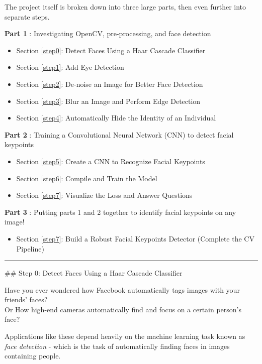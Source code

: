\documentclass[11pt]{article}
\providecommand{\tightlist}{%
      \setlength{\itemsep}{0pt}\setlength{\parskip}{0pt}}
\begin{document}
The project itself is broken down into three large parts, then even
further into separate steps.

\textbf{Part 1} : Investigating OpenCV, pre-processing, and face
detection

\begin{itemize}
\tightlist
\item
  Section \ref{step0}: Detect Faces Using a Haar Cascade Classifier
\item
  Section \ref{step1}: Add Eye Detection
\item
  Section \ref{step2}: De-noise an Image for Better Face Detection
\item
  Section \ref{step3}: Blur an Image and Perform Edge Detection
\item
  Section \ref{step4}: Automatically Hide the Identity of an Individual
\end{itemize}

\textbf{Part 2} : Training a Convolutional Neural Network (CNN) to
detect facial keypoints

\begin{itemize}
\tightlist
\item
  Section \ref{step5}: Create a CNN to Recognize Facial Keypoints
\item
  Section \ref{step6}: Compile and Train the Model
\item
  Section \ref{step7}: Visualize the Loss and Answer Questions
\end{itemize}

\textbf{Part 3} : Putting parts 1 and 2 together to identify facial
keypoints on any image!

\begin{itemize}
\tightlist
\item
  Section \ref{step7}: Build a Robust Facial Keypoints Detector
  (Complete the CV Pipeline)
\end{itemize}

    \begin{center}\rule{0.5\linewidth}{\linethickness}\end{center}

 \#\# Step 0: Detect Faces Using a Haar Cascade Classifier

Have you ever wondered how Facebook automatically tags images with your
friends' faces?\\
Or How high-end cameras automatically find and focus on a certain
person's face?

Applications like these depend heavily on the machine learning task
known as \emph{face detection} - which is the task of automatically
finding faces in images containing people.
\end{document}
